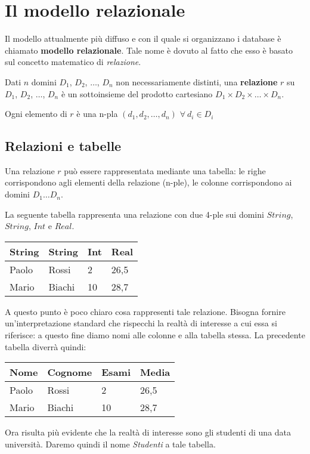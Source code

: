 \section{Il modello relazionale}
Il modello attualmente più diffuso e con il quale si organizzano i database è chiamato
\textbf{modello relazionale}. Tale nome è dovuto al fatto che esso è basato sul
concetto matematico di \emph{relazione}.
\begin{defn}
 Dati $n$ domini $D_1$, $D_2$, $\ldots$, $D_n$ non necessariamente distinti, una 
 \textbf{relazione} $r$ su $D_1$, $D_2$, $\ldots$, $D_n$ è un sottoinsieme del prodotto cartesiano
 $D_1 \times D_2 \times \ldots \times D_n$.
\end{defn}
Ogni elemento di $r$ è una n-pla $(d_1, d_2, \ldots, d_n)$  $\forall \ d_i \in D_i$

\subsection{Relazioni e tabelle}
Una relazione $r$ può essere rappresentata mediante una tabella: le righe corrispondono
agli elementi della relazione (n-ple), le colonne corrispondono ai domini $D_1\ldots D_n$.

\begin{exmp}
La seguente tabella rappresenta una relazione con due 4-ple sui domini $String$, $String$, 
$Int$ e $Real$.
 \begin{center}
  \begin{tabular}{llll}
    String & String & Int & Real\\
    \hline
    Paolo & Rossi & 2 & 26,5\\
    Mario & Biachi & 10 & 28,7
  \end{tabular}
 \end{center}
 A questo punto è poco chiaro cosa rappresenti tale relazione. Bisogna
 fornire un'interpretazione standard che rispecchi la realtà di interesse a cui essa si 
 riferisce: a questo fine diamo nomi alle colonne e alla tabella stessa. La precedente tabella
 diverrà quindi:

\begin{center}
  \begin{tabular}{l | l | l | l}
    Nome & Cognome & Esami & Media\\
    \hline
    Paolo & Rossi & 2 & 26,5\\
    Mario & Biachi & 10 & 28,7
  \end{tabular}
 \end{center}
 Ora risulta più evidente che la realtà di interesse sono gli studenti di una data università. 
 Daremo quindi il nome \emph{Studenti} a tale tabella.
\end{exmp}

